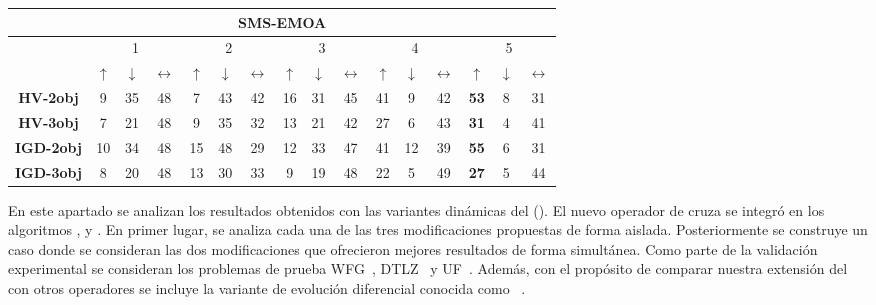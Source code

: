 \begin{table}[t]
\begin{scriptsize}
\begin{tabular}{|c|c|c|c|c|c|c|c|c|c|c|c|c|c|c|c|}
\hline
\hline
\multicolumn{16}{|c|}{SMS-EMOA} \\ \hline
 & \multicolumn{3}{c|}{1} & \multicolumn{3}{c|}{2} & \multicolumn{3}{c|}{3} & \multicolumn{3}{c|}{4} & \multicolumn{3}{c|}{5} \\ \hline
 & $\uparrow$ & $\downarrow$ & $\longleftrightarrow$ & $\uparrow$ & $\downarrow$ & $\longleftrightarrow$ & $\uparrow$ & $\downarrow$ & $\longleftrightarrow$ & $\uparrow$ & $\downarrow$ & $\longleftrightarrow$ & $\uparrow$ & $\downarrow$ & $\longleftrightarrow$ \\ \hline
\textbf{HV-2obj} & 9 & 35 & 48 & 7 & 43 & 42 & 16 & 31 & 45 & 41 & 9 & 42 & \textbf{53} & 8 & 31 \\ \hline
\textbf{HV-3obj} & 7 & 21 & 48 & 9 & 35 & 32 & 13 & 21 & 42 & 27 & 6 & 43 & \textbf{31} & 4 & 41 \\ \hline
\textbf{IGD-2obj} & 10 & 34 & 48 & 15 & 48 & 29 & 12 & 33 & 47 & 41 & 12 & 39 & \textbf{55} & 6 & 31 \\ \hline
\textbf{IGD-3obj} & 8 & 20 & 48 & 13 & 30 & 33 & 9 & 19 & 48 & 22 & 5 & 49 & \textbf{27} & 5 & 44 \\ \hline
\end{tabular}
\end{scriptsize}
\end{table}

En este apartado se analizan los resultados obtenidos con las variantes dinámicas del \SBX{} (\DSBX{}).
%
El nuevo operador de cruza se integró en los algoritmos \NSGAII{}, \MOEAD{} y \SMSEMOA{}.
%
En primer lugar, se analiza cada una de las tres modificaciones propuestas de forma aislada.
%
Posteriormente se construye un caso donde se consideran las dos modificaciones que ofrecieron mejores resultados de forma simultánea.
%
Como parte de la validación experimental se consideran los problemas de prueba WFG~\cite{Joel:WFG}, DTLZ~\cite{Joel:DTLZ_2} y UF~\cite{zhang2009performance}.
%
Además, con el propósito de comparar nuestra extensión del \SBX{} con otros operadores se incluye la variante de evolución diferencial conocida como \DEMO{}~\cite{tuvsar2007differential}.

